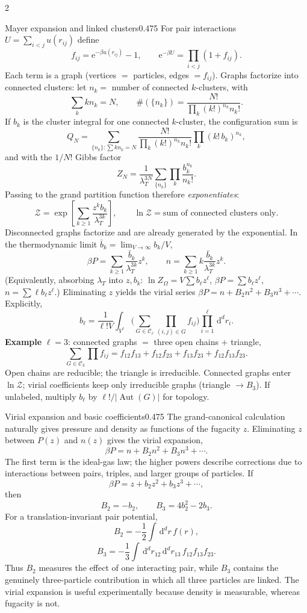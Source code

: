 \documentclass[8pt,a4paper]{extarticle}
\newcommand{\dd}{\,\mathrm d}
\newcommand{\e}{\mathrm e}
\begin{document}
\begin{multicols*}{2}
\begin{mytikzbox}{Mayer expansion and linked clusters}{0.475}
For pair interactions $U=\sum_{i<j}u(r_{ij})$ define
\[
f_{ij}=\e^{-\beta u(r_{ij})}-1,
\qquad \e^{-\beta U}=\prod_{i<j}(1+f_{ij}).
\]
Each term is a graph (vertices $=$ particles, edges $=f_{ij}$). Graphs factorize into
connected clusters: let $n_k=$ number of connected $k$-clusters, with
\[
\sum_k k n_k=N,
\qquad
\#(\{n_k\})=\frac{N!}{\prod_k(k!)^{n_k}n_k!}.
\]
If $b_k$ is the cluster integral for one connected $k$-cluster, the configuration sum is
\[
Q_N=\sum_{\{n_k\}:\sum kn_k=N}
\frac{N!}{\prod_k(k!)^{n_k}n_k!}
\prod_k(k!\,b_k)^{n_k},
\]
and with the $1/N!$ Gibbs factor
\[
Z_N=\frac1{\lambda_T^{3N}}
\sum_{\{n_k\}}
\prod_k\frac{b_k^{n_k}}{n_k!}.
\]
Passing to the grand partition function therefore \emph{exponentiates}:
\[
\mathcal Z
=\exp\!\left[
\sum_{k\ge1}\frac{z^k b_k}{\lambda_T^{3k}}
\right],
\qquad
\ln\mathcal Z
=\text{sum of connected clusters only}.
\]
Disconnected graphs factorize and are already generated by the exponential.
In the thermodynamic limit $\bar b_k=\lim_{V\to\infty}b_k/V$,
\[
\beta P=\sum_{k\ge1}\frac{\bar b_k}{\lambda_T^{3k}}z^k,
\qquad
n=\sum_{k\ge1}k\frac{\bar b_k}{\lambda_T^{3k}}z^k.
\]
(Equivalently, absorbing $\lambda_T$ into $z,b_k$:
$\ln Z_\Omega=V\sum b_\ell z^\ell$, $\beta P=\sum b_\ell z^\ell$, $n=\sum\ell b_\ell z^\ell$.)
Eliminating $z$ yields the virial series
$\beta P=n+B_2n^2+B_3n^3+\cdots$.
Explicitly,
\[
b_\ell=\frac1{\ell!V}\int_{V^\ell}
\Biggl(\sum_{G\in\mathcal C_\ell}\prod_{(i,j)\in G}f_{ij}\Biggr)
\prod_{i=1}^\ell\dd^dr_i.
\]
\textbf{Example} $\ell=3$: connected graphs $=$ three open chains $+$ triangle,
\[
\sum_{G\in\mathcal C_3}\prod f_{ij}
=f_{12}f_{13}+f_{12}f_{23}+f_{13}f_{23}+f_{12}f_{13}f_{23}.
\]
Open chains are reducible; the triangle is irreducible. Connected graphs enter
$\ln\mathcal Z$; virial coefficients keep only irreducible graphs (triangle $\to B_3$).
If unlabeled, multiply $b_\ell$ by $\ell!/|\operatorname{Aut}(G)|$ for topology.
\end{mytikzbox}

\begin{mytikzbox}{Virial expansion and basic coefficients}{0.475}
The grand-canonical calculation naturally gives pressure and density as functions of the fugacity \(z\). Eliminating \(z\) between \(P(z)\) and \(n(z)\) gives the virial expansion, \[ \beta P=n+B_2n^2+B_3n^3+\cdots. \] The first term is the ideal-gas law; the higher powers describe corrections due to interactions between pairs, triples, and larger groups of particles. If \[ \beta P=z+b_2z^2+b_3z^3+\cdots, \] then \[ B_2=-b_2, \qquad B_3=4b_2^2-2b_3. \] For a translation-invariant pair potential, \[ B_2=-\frac12\int\dd^dr\,f(r), \] \[ B_3=-\frac13\int\dd^dr_{12}\dd^dr_{13}\, f_{12}f_{13}f_{23}. \] Thus \(B_2\) measures the effect of one interacting pair, while \(B_3\) contains the genuinely three-particle contribution in which all three particles are linked. The virial expansion is useful experimentally because density is measurable, whereas fugacity is not. 


\end{mytikzbox}
\end{multicols*}
\end{document}
